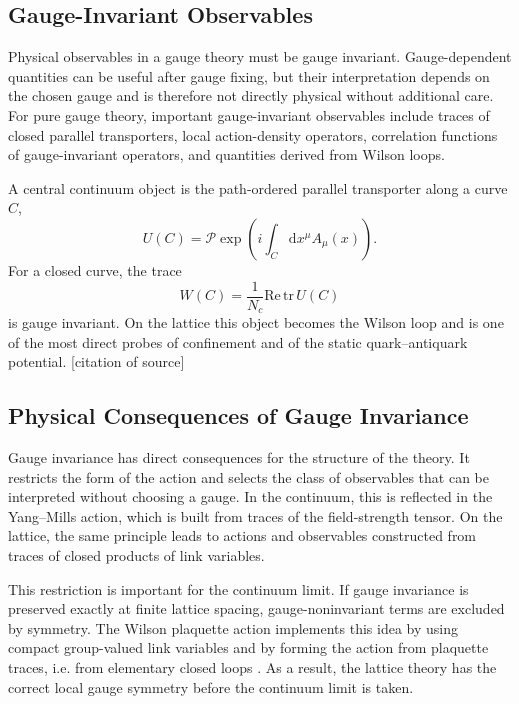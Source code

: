 \documentclass[12pt,a4paper,oneside,numbers=noenddot]{scrreprt}
\newcommand{\dd}{\mathrm{d}}
\begin{document}
\subsection{Gauge-Invariant Observables}
\label{subsec:gauge-invariant-observables}

Physical observables in a gauge theory must be gauge invariant. Gauge-dependent
quantities can be useful after gauge fixing, but their interpretation depends
on the chosen gauge and is therefore not directly physical without additional
care. For pure gauge theory, important gauge-invariant observables include
traces of closed parallel transporters, local action-density operators,
correlation functions of gauge-invariant operators, and quantities derived from
Wilson loops.

A central continuum object is the path-ordered parallel transporter along a
curve $C$,
\begin{equation}
  U(C)
  =
  \mathcal{P}
  \exp\left(
    i \int_C \dd x^\mu A_\mu(x)
  \right).
\end{equation}
For a closed curve, the trace
\begin{equation}
  W(C)
  =
  \frac{1}{N_c}
  \mathrm{Re}\,\mathrm{tr}\, U(C)
\end{equation}
is gauge invariant. On the lattice this object becomes the Wilson loop and is
one of the most direct probes of confinement and of the static quark--antiquark
potential. [citation of source]

\subsection{Physical Consequences of Gauge Invariance}
\label{subsec:consequences-gauge-invariance}

Gauge invariance has direct consequences for the structure of the theory. It
restricts the form of the action and selects the class of observables that can
be interpreted without choosing a gauge. In the continuum, this is reflected in
the Yang--Mills action, which is built from traces of the field-strength tensor.
On the lattice, the same principle leads to actions and observables constructed
from traces of closed products of link variables.

This restriction is important for the continuum limit. If gauge invariance is
preserved exactly at finite lattice spacing, gauge-noninvariant terms are
excluded by symmetry. The Wilson plaquette action implements this idea by using
compact group-valued link variables and by forming the action from plaquette
traces, i.e. from elementary closed loops
\cite{Wilson1974,GattringerLang2010,MontvayMuenster1994}. As a result, the
lattice theory has the correct local gauge symmetry before the continuum limit
is taken.
\end{document}
